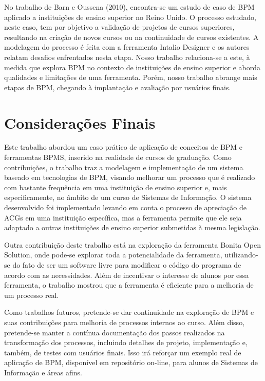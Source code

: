 \documentclass[12pt]{article}
\begin{document}
No trabalho de Barn e Oussena (2010), encontra-se um estudo de caso de BPM aplicado a instituições de ensino superior no Reino Unido. O processo estudado, neste caso, tem por objetivo a validação de projetos de cursos superiores, resultando na criação de novos cursos ou na continuidade de cursos existentes. A modelagem do processo é feita com a ferramenta Intalio Designer e os autores relatam desafios enfrentados nesta etapa. Nosso trabalho relaciona-se a este, à medida que explora BPM no contexto de instituições de ensino superior e aborda qualidades e limitações de uma ferramenta. Porém, nosso trabalho abrange mais etapas de BPM, chegando à implantação e avaliação por usuários finais. 





\section{Considerações Finais}

Este trabalho abordou um caso prático de aplicação de conceitos de BPM e ferramentas BPMS, inserido na realidade de cursos de graduação. Como contribuições, o trabalho traz a modelagem e implementação de um sistema baseado em tecnologias de BPM, visando melhorar um processo que é realizado com bastante frequência em uma instituição de ensino superior e, mais especificamente, no âmbito de um curso de Sistemas de Informação. O sistema desenvolvido foi implementado levando em conta o processo de apreciação de ACGs em uma instituição específica, mas a ferramenta permite que ele seja adaptado a outras instituições de ensino superior submetidas à mesma legislação.

Outra contribuição deste trabalho está na exploração da ferramenta Bonita Open Solution, onde pode-se explorar toda a potencialidade da ferramenta, utilizando-se do fato de ser um software livre para modificar o código do programa de acordo com as necessidades. Além de incentivar o interesse de alunos por essa ferramenta, o trabalho mostrou que a ferramenta é eficiente para a melhoria de um processo real.

Como trabalhos futuros, pretende-se dar continuidade na exploração de BPM e suas contribuições para melhoria de processos internos ao curso. Além disso, pretende-se manter a contínua documentação dos passos realizados na transformação dos processos, incluindo detalhes de projeto, implementação e, também, de testes com usuários finais. Isso irá reforçar um exemplo real de aplicação de BPM, disponível em repositório on-line, para alunos de Sistemas de Informação e áreas afins.




\end{document}
